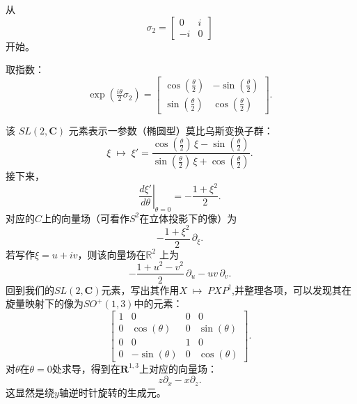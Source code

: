 从
\[
\sigma_{2} =
\begin{bmatrix}
0 & i \\
- i & 0
\end{bmatrix}~
\]
开始。

取指数：
\[
\exp\!\left(\tfrac{i\theta}{2}\sigma_{2}\right) =
\begin{bmatrix}
\cos\!\left(\tfrac{\theta}{2}\right) & -\sin\!\left(\tfrac{\theta}{2}\right) \\
\sin\!\left(\tfrac{\theta}{2}\right) & \cos\!\left(\tfrac{\theta}{2}\right)
\end{bmatrix}.~
\]

该 $SL(2,\mathbf{C})$ 元素表示一参数（椭圆型）莫比乌斯变换子群：
\[
\xi \;\mapsto\; \xi' = 
\frac{\cos\!\left(\tfrac{\theta}{2}\right)\,\xi - \sin\!\left(\tfrac{\theta}{2}\right)}
{\sin\!\left(\tfrac{\theta}{2}\right)\,\xi + \cos\!\left(\tfrac{\theta}{2}\right)}.~
\]
接下来，
\[
\left.\frac{d\xi'}{d\theta}\right|_{\theta = 0}
= -\frac{1+\xi^{2}}{2}.~
\]
对应的$C$上的向量场（可看作$S^{2}$在立体投影下的像）为
\[
-\frac{1+\xi^{2}}{2}\,\partial_{\xi}.~
\]
若写作$\xi = u + iv$，则该向量场在$\mathbb{R}^{2}$ 上为
\[
-\frac{1+u^{2}-v^{2}}{2}\,\partial_{u} - uv\,\partial_{v}.~
\]
回到我们的$SL(2,\mathbf{C})$元素，写出其作用$X \;\mapsto\; PXP^{\dagger}$,并整理各项，可以发现其在旋量映射下的像为$SO^{+}(1,3)$中的元素：
\[
\begin{bmatrix}
1 & 0 & 0 & 0 \\
0 & \cos(\theta) & 0 & \sin(\theta) \\
0 & 0 & 1 & 0 \\
0 & -\sin(\theta) & 0 & \cos(\theta)
\end{bmatrix}.~
\]
对$\theta$在$\theta=0$处求导，得到在$\mathbf{R}^{1,3}$上对应的向量场：
\[
z\partial_{x} - x\partial_{z}.~
\]
这显然是绕$y$轴逆时针旋转的生成元。
